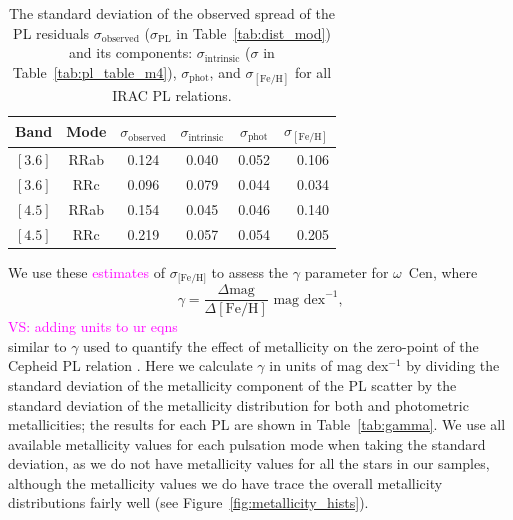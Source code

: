 \documentclass[a4paper,fleqn,usenatbib]{mnras}
\providecommand{\vscomment}[1]{{\textcolor{magenta}{{VS: #1}}}\xspace}
\begin{document}
\begin{table}
\centering
\caption{The standard deviation of the observed spread of the PL residuals $\sigma_{\text{observed}}$ ($\sigma_{\text{PL}}$ in Table~\ref{tab:dist_mod}) and its components: $\sigma_{\text{intrinsic}}$ ($\sigma$ in Table~\ref{tab:pl_table_m4}), $\sigma_{\text{phot}}$, and $\sigma_{[\text{Fe/H}]}$ for all IRAC PL relations.}
\label{tab:metallicity_sigma}
\begin{tabular}{lccccr} 
\hline \hline
Band & Mode & $\sigma_{\text{observed}}$ & $\sigma_{\text{intrinsic}}$ & $\sigma_{\text{phot}}$ & $\sigma_{[\text{Fe/H}]}$ \\
\hline
$[3.6]$ & RRab & 0.124 & 0.040 & 0.052 & 0.106 \\
$[3.6]$ & RRc & 0.096 & 0.079 & 0.044 & 0.034 \\
$[4.5]$ & RRab & 0.154 & 0.045 & 0.046 & 0.140 \\
$[4.5]$ & RRc & 0.219 & 0.057 & 0.054 & 0.205 \\
\hline
\end{tabular}
\end{table}

We use these \textcolor{magenta}{estimates} of $\sigma_\text{[Fe/H]}$ to assess the $\gamma$ parameter for $\omega$~Cen, where 
\begin{equation} \label{eqn:gamma}
\gamma = \dfrac {\Delta \text{mag}} {\Delta [\text{Fe/H}]}\text{ mag dex} ^{-1}\text{,}
\end{equation}
\vscomment{adding units to ur eqns\\}
similar to $\gamma$ used to quantify the effect of metallicity on the zero-point of the Cepheid PL relation \citep{1998ApJ...498..181K, 2009MNRAS.396.1287S}. Here we calculate $\gamma$ in units of mag dex$^{-1}$ by dividing the standard deviation of the metallicity component of the PL scatter by the standard deviation of the metallicity distribution for both \citep{2006ApJ...640L..43S} and photometric \citep{2000AJ....119.1824R} metallicities; the results for each PL are shown in Table~\ref{tab:gamma}. We use all available metallicity values for each pulsation mode when taking the standard deviation, as we do not have metallicity values for all the stars in our samples, although the metallicity values we do have trace the overall metallicity distributions fairly well (see Figure~\ref{fig:metallicity_hists}).
\end{document}
